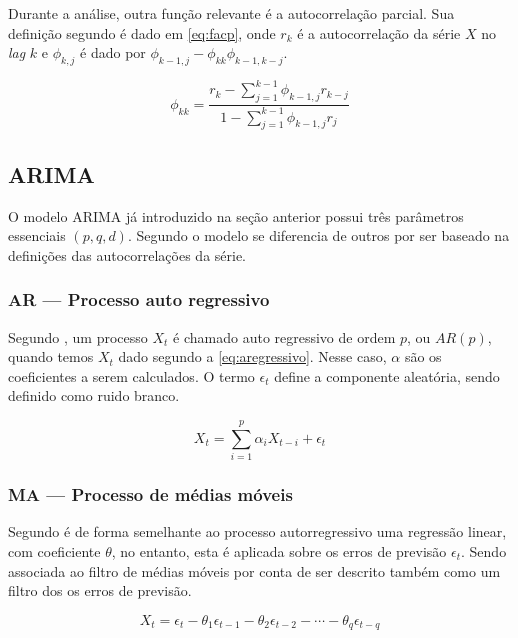 \documentclass[
    12pt,
    oneside,
    a4paper,
    english,
    brazil
]{abntex2}
\begin{document}
Durante  a análise,  outra função  relevante  é a  autocorrelação parcial.  Sua
definição segundo  é dado  em \autoref{eq:facp}, onde $r_k$ é
a autocorrelação  da série $X$  no \textit{lag} $k$  e $\phi_{k,j}$ é  dado por
$\phi_{k-1, j}-\phi_{kk}\phi_{k-1,k-j}$.

\begin{equation}
    \label{eq:facp}
    \phi_{kk} = \frac{r_k-\sum_{j=1}^{k-1}{\phi_{k-1,j}r_{k-j}}}{1-\sum_{j=1}^{k-1}{\phi_{k-1,j}r_{j}}}
\end{equation}

\subsection{ARIMA}

O  modelo  ARIMA  já  introduzido  na seção  anterior  possui  três  parâmetros
essenciais $(p,q,d)$. Segundo  o modelo se diferencia de outros
por ser baseado na definições das autocorrelações da série.

\subsubsection{AR --- Processo auto regressivo}

Segundo  ,  um  processo  $X_t$ é  chamado  auto  regressivo
de   ordem   $p$,   ou   $AR(p)$,   quando   temos   $X_t$   dado   segundo   a
\autoref{eq:aregressivo}.  Nesse caso,  $\alpha$  são os  coeficientes a  serem
calculados. O termo $\epsilon_t$ define  a componente aleatória, sendo definido
como ruido branco.

\begin{equation}
    \label{eq:aregressivo}
    X_t = \sum_{i = 1}^{p}{\alpha_{i}X_{t-i}} + \epsilon_t
\end{equation}

\subsubsection{MA --- Processo de médias móveis}

Segundo  é de forma  semelhante ao processo autorregressivo uma
regressão linear, com  coeficiente $\theta$, no entanto, esta  é aplicada sobre
os erros de  previsão $\epsilon_t$. Sendo associada ao filtro  de médias móveis
por conta de ser descrito também como um filtro dos os erros de previsão.

\begin{equation}
    \label{eq:pmediasmoveis}
    X_t = \epsilon_t - \theta_1\epsilon_{t-1} - \theta_2\epsilon_{t-2} - \cdots - \theta_{q}\epsilon_{t-q}
\end{equation}
\end{document}
